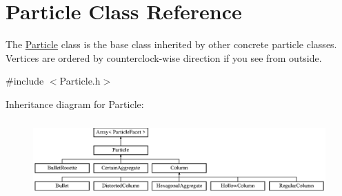 \hypertarget{class_particle}{}\section{Particle Class Reference}
\label{class_particle}


The \mbox{\hyperlink{class_particle}{Particle}} class is the base class inherited by other concrete particle classes. Vertices are ordered by counterclock-\/wise direction if you see from outside.  




{\ttfamily \#include $<$Particle.\+h$>$}

Inheritance diagram for Particle\+:\begin{figure}[H]
\begin{center}
\leavevmode
\includegraphics[height=2.947368cm]{class_particle}
\end{center}
\end{figure}
